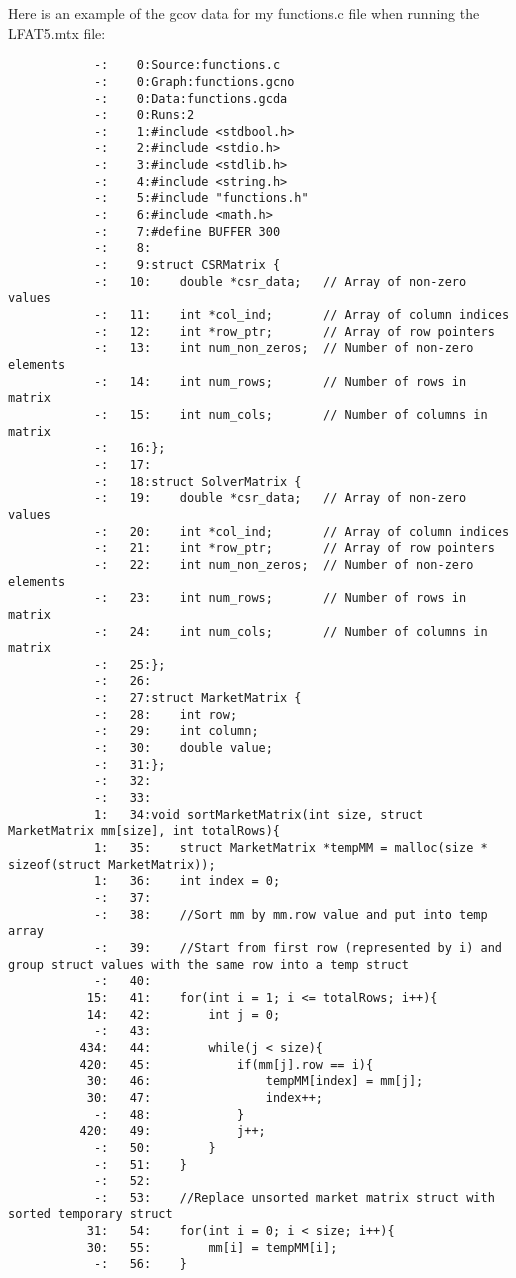 \documentclass[12pt]{article}
\begin{document}
	Here is an example of the gcov data for my functions.c file when running the LFAT5.mtx file:
	\begin{mdframed}[style=myboxstyleTerminal1]
		\begin{verbatim}
			-:    0:Source:functions.c
			-:    0:Graph:functions.gcno
			-:    0:Data:functions.gcda
			-:    0:Runs:2
			-:    1:#include <stdbool.h>
			-:    2:#include <stdio.h>
			-:    3:#include <stdlib.h>
			-:    4:#include <string.h>
			-:    5:#include "functions.h"
			-:    6:#include <math.h>
			-:    7:#define BUFFER 300
			-:    8:
			-:    9:struct CSRMatrix {
			-:   10:    double *csr_data;   // Array of non-zero values
			-:   11:    int *col_ind;       // Array of column indices
			-:   12:    int *row_ptr;       // Array of row pointers
			-:   13:    int num_non_zeros;  // Number of non-zero elements
			-:   14:    int num_rows;       // Number of rows in matrix
			-:   15:    int num_cols;       // Number of columns in matrix    
			-:   16:};
			-:   17:
			-:   18:struct SolverMatrix {
			-:   19:    double *csr_data;   // Array of non-zero values
			-:   20:    int *col_ind;       // Array of column indices
			-:   21:    int *row_ptr;       // Array of row pointers
			-:   22:    int num_non_zeros;  // Number of non-zero elements
			-:   23:    int num_rows;       // Number of rows in matrix
			-:   24:    int num_cols;       // Number of columns in matrix    
			-:   25:};
			-:   26:
			-:   27:struct MarketMatrix {
			-:   28:    int row;
			-:   29:    int column;
			-:   30:    double value;
			-:   31:};
			-:   32:
			-:   33:
			1:   34:void sortMarketMatrix(int size, struct MarketMatrix mm[size], int totalRows){
			1:   35:    struct MarketMatrix *tempMM = malloc(size * sizeof(struct MarketMatrix));
			1:   36:    int index = 0;
			-:   37:
			-:   38:    //Sort mm by mm.row value and put into temp array
			-:   39:    //Start from first row (represented by i) and group struct values with the same row into a temp struct
			-:   40:    
		   15:   41:    for(int i = 1; i <= totalRows; i++){
		   14:   42:        int j = 0; 
			-:   43:
		  434:   44:        while(j < size){ 
		  420:   45:            if(mm[j].row == i){
		   30:   46:                tempMM[index] = mm[j];
		   30:   47:                index++;
			-:   48:            }
		  420:   49:            j++;
			-:   50:        }
			-:   51:    }  
			-:   52:
			-:   53:    //Replace unsorted market matrix struct with sorted temporary struct
		   31:   54:    for(int i = 0; i < size; i++){
		   30:   55:        mm[i] = tempMM[i];
			-:   56:    } 

\end{verbatim}
\end{mdframed}
\end{document}
